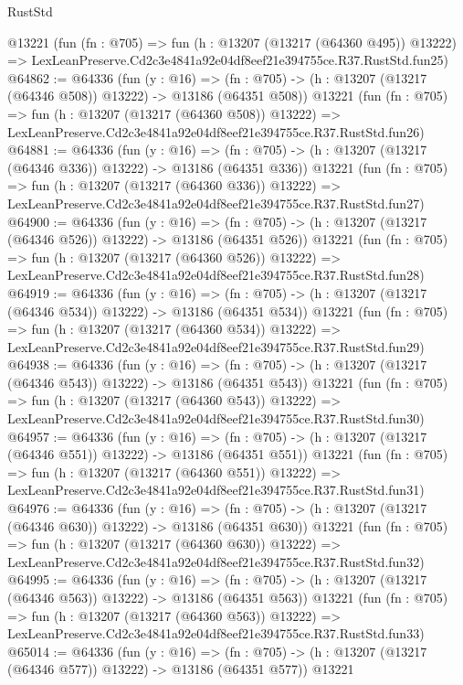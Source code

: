 \begin{lexlean}{RustStd}
\begin{coremodule}
    @13221
    (fun (fn : @705) =>
    fun (h : @13207 (@13217 (@64360 @495)) @13222) =>
    LexLeanPreserve.Cd2c3e4841a92e04df8eef21e394755ce.R37.RustStd.fun25)
@64862 := @64336
    (fun (y : @16) =>
    (fn : @705) -> (h : @13207 (@13217 (@64346 @508)) @13222) -> @13186 (@64351 @508))
    @13221
    (fun (fn : @705) =>
    fun (h : @13207 (@13217 (@64360 @508)) @13222) =>
    LexLeanPreserve.Cd2c3e4841a92e04df8eef21e394755ce.R37.RustStd.fun26)
@64881 := @64336
    (fun (y : @16) =>
    (fn : @705) -> (h : @13207 (@13217 (@64346 @336)) @13222) -> @13186 (@64351 @336))
    @13221
    (fun (fn : @705) =>
    fun (h : @13207 (@13217 (@64360 @336)) @13222) =>
    LexLeanPreserve.Cd2c3e4841a92e04df8eef21e394755ce.R37.RustStd.fun27)
@64900 := @64336
    (fun (y : @16) =>
    (fn : @705) -> (h : @13207 (@13217 (@64346 @526)) @13222) -> @13186 (@64351 @526))
    @13221
    (fun (fn : @705) =>
    fun (h : @13207 (@13217 (@64360 @526)) @13222) =>
    LexLeanPreserve.Cd2c3e4841a92e04df8eef21e394755ce.R37.RustStd.fun28)
@64919 := @64336
    (fun (y : @16) =>
    (fn : @705) -> (h : @13207 (@13217 (@64346 @534)) @13222) -> @13186 (@64351 @534))
    @13221
    (fun (fn : @705) =>
    fun (h : @13207 (@13217 (@64360 @534)) @13222) =>
    LexLeanPreserve.Cd2c3e4841a92e04df8eef21e394755ce.R37.RustStd.fun29)
@64938 := @64336
    (fun (y : @16) =>
    (fn : @705) -> (h : @13207 (@13217 (@64346 @543)) @13222) -> @13186 (@64351 @543))
    @13221
    (fun (fn : @705) =>
    fun (h : @13207 (@13217 (@64360 @543)) @13222) =>
    LexLeanPreserve.Cd2c3e4841a92e04df8eef21e394755ce.R37.RustStd.fun30)
@64957 := @64336
    (fun (y : @16) =>
    (fn : @705) -> (h : @13207 (@13217 (@64346 @551)) @13222) -> @13186 (@64351 @551))
    @13221
    (fun (fn : @705) =>
    fun (h : @13207 (@13217 (@64360 @551)) @13222) =>
    LexLeanPreserve.Cd2c3e4841a92e04df8eef21e394755ce.R37.RustStd.fun31)
@64976 := @64336
    (fun (y : @16) =>
    (fn : @705) -> (h : @13207 (@13217 (@64346 @630)) @13222) -> @13186 (@64351 @630))
    @13221
    (fun (fn : @705) =>
    fun (h : @13207 (@13217 (@64360 @630)) @13222) =>
    LexLeanPreserve.Cd2c3e4841a92e04df8eef21e394755ce.R37.RustStd.fun32)
@64995 := @64336
    (fun (y : @16) =>
    (fn : @705) -> (h : @13207 (@13217 (@64346 @563)) @13222) -> @13186 (@64351 @563))
    @13221
    (fun (fn : @705) =>
    fun (h : @13207 (@13217 (@64360 @563)) @13222) =>
    LexLeanPreserve.Cd2c3e4841a92e04df8eef21e394755ce.R37.RustStd.fun33)
@65014 := @64336
    (fun (y : @16) =>
    (fn : @705) -> (h : @13207 (@13217 (@64346 @577)) @13222) -> @13186 (@64351 @577))
    @13221

\end{coremodule}
\end{lexlean}
